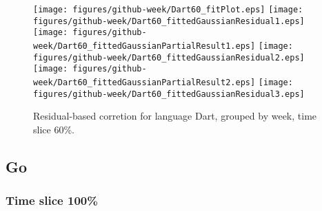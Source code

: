 \begin{figure}[hb]
\centering
{}
{\texttt{[image: figures/github-week/Dart60\_fitPlot.eps]}}
{\texttt{[image: figures/github-week/Dart60\_fittedGaussianResidual1.eps]}}
{\texttt{[image: figures/github-week/Dart60\_fittedGaussianPartialResult1.eps]}}
{\texttt{[image: figures/github-week/Dart60\_fittedGaussianResidual2.eps]}}
{\texttt{[image: figures/github-week/Dart60\_fittedGaussianPartialResult2.eps]}}
{\texttt{[image: figures/github-week/Dart60\_fittedGaussianResidual3.eps]}}
\caption{Residual-based corretion for language Dart, grouped by week, time slice 60\%.}
\end{figure}


\clearpage 
\newpage 


\subsection{Go}

\FloatBarrier

\subsubsection{Time slice 100\%}

